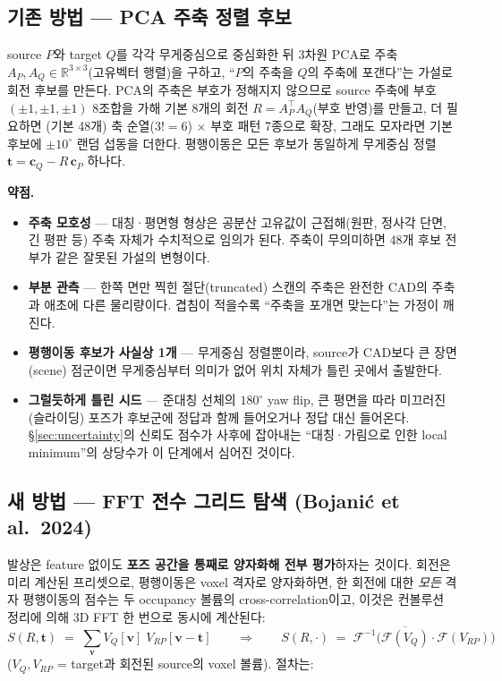 \subsection{기존 방법 --- PCA 주축 정렬 후보}

source $P$와 target $Q$를 각각 무게중심으로 중심화한 뒤 3차원 PCA로 주축
$A_P, A_Q \in \mathbb{R}^{3\times3}$(고유벡터 행렬)을 구하고, ``$P$의
주축을 $Q$의 주축에 포갠다''는 가설로 회전 후보를 만든다. PCA의 주축은
부호가 정해지지 않으므로 source 주축에 부호 $(\pm1,\pm1,\pm1)$ 8조합을
가해 기본 8개의 회전 $R = A_P^{\top}A_Q$(부호 반영)를 만들고, 더 필요하면
(기본 48개) 축 순열($3!=6$) $\times$ 부호 패턴 7종으로 확장, 그래도
모자라면 기본 후보에 $\pm10^\circ$ 랜덤 섭동을 더한다. 평행이동은 모든
후보가 동일하게 무게중심 정렬 $\mathbf{t} = \mathbf{c}_Q - R\,\mathbf{c}_P$
하나다.

\textbf{약점.}
\begin{itemize}
  \item \textbf{주축 모호성} --- 대칭·평면형 형상은 공분산 고유값이
  근접해(원판, 정사각 단면, 긴 평판 등) 주축 자체가 수치적으로 임의가
  된다. 주축이 무의미하면 48개 후보 전부가 같은 잘못된 가설의 변형이다.
  \item \textbf{부분 관측} --- 한쪽 면만 찍힌 절단(truncated) 스캔의
  주축은 완전한 CAD의 주축과 애초에 다른 물리량이다. 겹침이 적을수록
  ``주축을 포개면 맞는다''는 가정이 깨진다.
  \item \textbf{평행이동 후보가 사실상 1개} --- 무게중심 정렬뿐이라,
  source가 CAD보다 큰 장면(scene) 점군이면 무게중심부터 의미가 없어
  위치 자체가 틀린 곳에서 출발한다.
  \item \textbf{그럴듯하게 틀린 시드} --- 준대칭 선체의 $180^\circ$ yaw
  flip, 큰 평면을 따라 미끄러진(슬라이딩) 포즈가 후보군에 정답과 함께
  들어오거나 정답 대신 들어온다. \S\ref{sec:uncertainty}의 신뢰도 점수가
  사후에 잡아내는 ``대칭·가림으로 인한 local minimum''의 상당수가 이
  단계에서 심어진 것이다.
\end{itemize}

\subsection{새 방법 --- FFT 전수 그리드 탐색 (Bojanić et al.\ 2024)}

발상은 feature 없이도 \textbf{포즈 공간을 통째로 양자화해 전부 평가}하자는
것이다. 회전은 미리 계산된 프리셋으로, 평행이동은 voxel 격자로 양자화하면,
한 회전에 대한 \emph{모든} 격자 평행이동의 점수는 두 occupancy 볼륨의
cross-correlation이고, 이것은 컨볼루션 정리에 의해 3D FFT 한 번으로 동시에
계산된다:
\begin{equation*}
  S(R,\mathbf{t}) \;=\; \sum_{\mathbf{v}} V_Q[\mathbf{v}]\;
  V_{RP}[\mathbf{v}-\mathbf{t}]
  \qquad\Longrightarrow\qquad
  S(R,\cdot) \;=\; \mathcal{F}^{-1}\!\big(\overline{\mathcal{F}(V_Q)}\cdot
  \mathcal{F}(V_{RP})\big)
\end{equation*}
($V_Q, V_{RP}$ = target과 회전된 source의 voxel 볼륨). 절차는:


